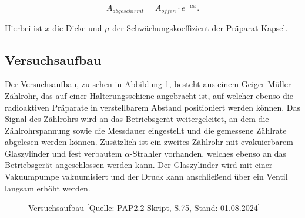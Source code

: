 \documentclass{article}
\begin{document}
\begin{equation}
    A_{abgeschirmt} = A_{offen} \cdot e^{-\mu x}.
    \label{eq:Absorptionskorrektur}
\end{equation}

Hierbei ist $x$ die Dicke und $\mu$ der Schwächungskoeffizient der Präparat-Kapsel.


\newpage
\subsection{Versuchsaufbau}

Der Versuchsaufbau, zu sehen in Abbildung \ref{fig:aufbau}, besteht aus einem Geiger-Müller-Zählrohr, das auf einer Halterungsschiene angebracht ist, auf welcher ebenso die radioaktiven Präparate in verstellbarem Abstand positioniert werden können. Das Signal des Zählrohrs wird an das Betriebsgerät weitergeleitet, an dem die Zählrohrspannung sowie die Messdauer eingestellt und die gemessene Zählrate abgelesen werden können. Zusätzlich ist ein zweites Zählrohr mit evakuierbarem Glaszylinder und fest verbautem $\alpha$-Strahler vorhanden, welches ebenso an das Betriebsgerät angeschlossen werden kann. Der Glaszylinder wird mit einer Vakuumpumpe vakuumisiert und der Druck kann anschließend über ein Ventil langsam erhöht werden. 

\phantom{.}

\begin{figure}[!h]
    \centering
    \caption{Versuchsaufbau [Quelle: PAP2.2 Skript, S.75, Stand: 01.08.2024]}
    \label{fig:aufbau}
\end{figure}


\phantom{.}





\newpage
\end{document}
